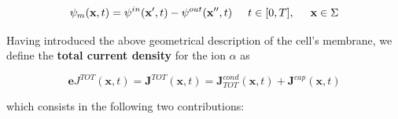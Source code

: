\documentclass[12pt, a4paper]{report}
\begin{document}
\begin{equation}
\psi_m (\textbf{x},t) = \psi^{in} (\textbf{x}',t) -  \psi^{out} (\textbf{x}'',t) \hspace{0.5 cm}  t \in [0,T], \hspace{0.5 cm} \textbf{x} \in \Sigma
\end{equation}



Having introduced the above geometrical description of the cell's membrane, we define the \textbf{total current density} for the  ion $\alpha$ as

\begin{equation}
\textbf{e} J^{TOT}(\textbf{x},t) =	\textbf{J}^{TOT}(\textbf{x},t) = \textbf{J}^{cond}_{TOT}(\textbf{x},t) +\textbf{J}^{cap}(\textbf{x},t) 
\end{equation}	

which consists in the following two contributions:
\end{document}

